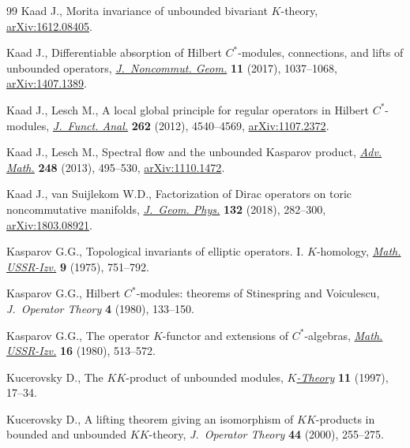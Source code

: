 \documentclass[pdftex]{sigma}
\numberwithin{equation}{section}
\begin{document}
\begin{thebibliography}{99}
Kaad J., Morita invariance of unbounded bivariant {$K$}-theory,
 \href{https://arxiv.org/abs/1612.08405}{arXiv:1612.08405}.

Kaad J., Differentiable absorption of {H}ilbert {$C^*$}-modules, connections,
 and lifts of unbounded operators, \href{https://doi.org/10.4171/JNCG/11-3-8}{\textit{J.~Noncommut. Geom.}} \textbf{11}
 (2017), 1037--1068, \href{https://arxiv.org/abs/1407.1389}{arXiv:1407.1389}.

Kaad J., Lesch M., A local global principle for regular operators in {H}ilbert
 {$C^*$}-modules, \href{https://doi.org/10.1016/j.jfa.2012.03.002}{\textit{J.~Funct. Anal.}} \textbf{262} (2012), 4540--4569,
 \href{https://arxiv.org/abs/1107.2372}{arXiv:1107.2372}.

Kaad J., Lesch M., Spectral flow and the unbounded {K}asparov product,
 \href{https://doi.org/10.1016/j.aim.2013.08.015}{\textit{Adv. Math.}} \textbf{248} (2013), 495--530, \href{https://arxiv.org/abs/1110.1472}{arXiv:1110.1472}.

Kaad J., van Suijlekom W.D., Factorization of {D}irac operators on toric
 noncommutative manifolds, \href{https://doi.org/10.1016/j.geomphys.2018.05.027}{\textit{J.~Geom. Phys.}} \textbf{132} (2018),
 282--300, \href{https://arxiv.org/abs/1803.08921}{arXiv:1803.08921}.

Kasparov G.G., Topological invariants of elliptic operators. {I}.
 {$K$}-homology, \href{https://doi.org/10.1070/IM1975v009n04ABEH001497}{\textit{Math. USSR-Izv.}} \textbf{9} (1975), 751--792.

Kasparov G.G., Hilbert {$C^*$}-modules: theorems of {S}tinespring and
 {V}oiculescu, \textit{J.~Operator Theory} \textbf{4} (1980), 133--150.

Kasparov G.G., The operator {$K$}-functor and extensions of {$C^*$}-algebras,
 \href{http://dx.doi.org/10.1070/IM1981v016n03ABEH001320}{\textit{Math. USSR-Izv.}} \textbf{16} (1980), 513--572.

Kucerovsky D., The {$KK$}-product of unbounded modules, \href{https://doi.org/10.1023/A:1007751017966}{\textit{$K$-Theory}}
 \textbf{11} (1997), 17--34.

Kucerovsky D., A lifting theorem giving an isomorphism of {$KK$}-products in
 bounded and unbounded {$KK$}-theory, \textit{J.~Operator Theory} \textbf{44}
 (2000), 255--275.


\end{thebibliography}
\end{document}

